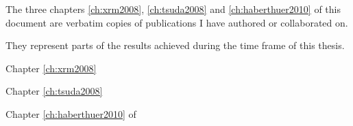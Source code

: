 \label{ch:publications}
The three chapters \ref{ch:xrm2008}, \ref{ch:tsuda2008} and \ref{ch:haberthuer2010} of this document are verbatim copies of publications I have authored or collaborated on.

They represent parts of the results achieved during the time frame of this thesis.

Chapter \ref{ch:xrm2008}

Chapter \ref{ch:tsuda2008} 

Chapter \ref{ch:haberthuer2010} of